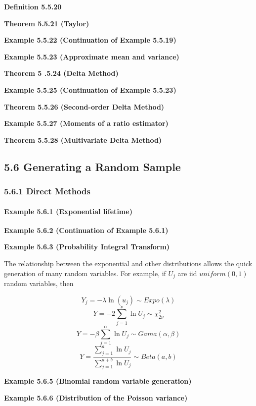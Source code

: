 \documentclass[6pt,Portrait]{article}
\let\oldparagraph\paragraph
\renewcommand{\paragraph}[1]{\oldparagraph{#1}\mbox{}}
\begin{document}
\textbf{Definition 5.5.20}

\textbf{Theorem 5.5.21 (Taylor)}

\textbf{Example 5.5.22 (Continuation of Example 5.5.19)}

\textbf{Example 5.5.23 (Approximate mean and variance)}

\textbf{Theorem 5 .5.24 (Delta Method)}

\textbf{Example 5.5.25 (Continuation of Example 5.5.23)}

\textbf{Theorem 5.5.26 (Second-order Delta Method)}

\textbf{Example 5.5.27 (Moments of a ratio estimator)}

\textbf{Theorem 5.5.28 (Multivariate Delta Method)}

\hypertarget{generating-a-random-sample}{%
\subsection{5.6 Generating a Random
Sample}\label{generating-a-random-sample}}

\hypertarget{direct-methods}{%
\subsubsection{5.6.1 Direct Methods}\label{direct-methods}}

\hypertarget{lifetime}{%
\paragraph{\texorpdfstring{\textbf{Example 5.6.1 (Exponential
lifetime)}}{Example 5.6.1 (Exponential lifetime)}}\label{lifetime}}

\textbf{Example 5.6.2 (Continuation of Example 5.6.1)}

\textbf{Example 5.6.3 (Probability Integral Transform)}

The relationship between the exponential and other distributions allows
the quick generation of many random variables. For example, if \(U_j\)
are iid \(uniform(0,1)\) random variables, then

\[Y_j=-\lambda\ln(u_j)\sim Expo(\lambda)\]
\[Y=-2\sum_{j=1}^\nu\ln U_j\sim \chi^2_{2\nu}\]
\[Y=-\beta\sum_{j=1}^\alpha\ln U_j\sim Gama(\alpha,\beta)\]
\[Y=\frac{\sum_{j=1}^a\ln U_j}{\sum_{j=1}^{a+b}\ln U_j}\sim Beta(a,b)\]

\textbf{Example 5.6.5 (Binomial random variable generation)}

\textbf{Example 5.6.6 (Distribution of the Poisson variance)}
\end{document}
